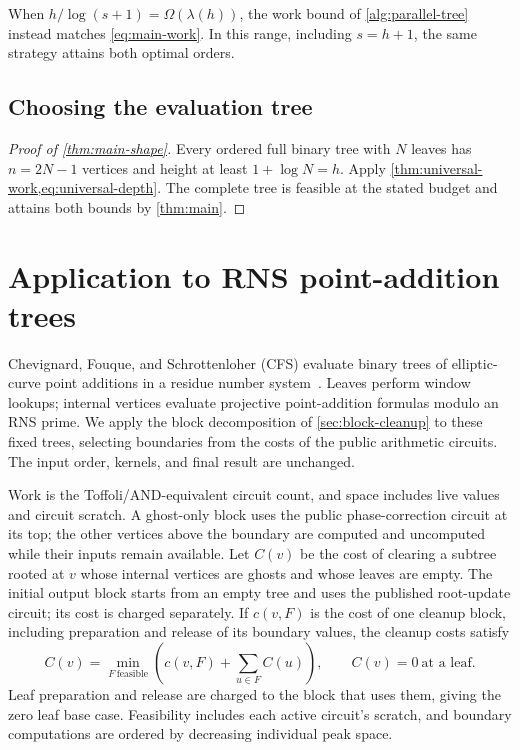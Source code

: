 \documentclass[11pt]{article}
\theoremstyle{definition}
\theoremstyle{remark}
\begin{document}
When $h/\log(s+1)=\Omega(\lambda(h))$, the work bound of \cref{alg:parallel-tree} instead matches \cref{eq:main-work}. In this range, including $s=h+1$, the same strategy attains both optimal orders.

\subsection{Choosing the evaluation tree}
\label{sec:tree-shape}

\begin{proof}[Proof of \cref{thm:main-shape}]
Every ordered full binary tree with $N$ leaves has $n=2N-1$ vertices and height at least $1+\log N=h$. Apply \cref{thm:universal-work,eq:universal-depth}. The complete tree is feasible at the stated budget and attains both bounds by \cref{thm:main}.
\end{proof}

\section{Application to RNS point-addition trees}
\label{sec:cfs-case-study}

Chevignard, Fouque, and Schrottenloher (CFS) evaluate binary trees of elliptic-curve point additions in a residue number system~\cite{CFS2026}. Leaves perform window lookups; internal vertices evaluate projective point-addition formulas modulo an RNS prime. We apply the block decomposition of \cref{sec:block-cleanup} to these fixed trees, selecting boundaries from the costs of the public arithmetic circuits. The input order, kernels, and final result are unchanged.

Work is the Toffoli/AND-equivalent circuit count, and space includes live values and circuit scratch. A ghost-only block uses the public phase-correction circuit at its top; the other vertices above the boundary are computed and uncomputed while their inputs remain available. Let $C(v)$ be the cost of clearing a subtree rooted at $v$ whose internal vertices are ghosts and whose leaves are empty. The initial output block starts from an empty tree and uses the published root-update circuit; its cost is charged separately. If $c(v,F)$ is the cost of one cleanup block, including preparation and release of its boundary values, the cleanup costs satisfy
\begin{equation}
 C(v)=\min_{F\ \mathrm{feasible}}\left(c(v,F)+\sum_{u\in F}C(u)\right),
 \qquad C(v)=0\ \text{at a leaf}.
 \label{eq:cfs-cut-work}
\end{equation}
Leaf preparation and release are charged to the block that uses them, giving the zero leaf base case. Feasibility includes each active circuit's scratch, and boundary computations are ordered by decreasing individual peak space.
\end{document}
